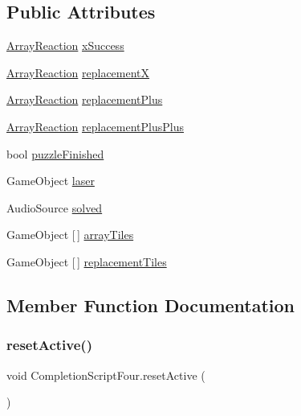 \subsection*{Public Attributes}
\begin{DoxyCompactItemize}
\item 
\hyperlink{class_array_reaction}{Array\+Reaction} \hyperlink{class_completion_script_four_a747aafbf72eb507c388cb72ad6911b13}{x\+Success}
\item 
\hyperlink{class_array_reaction}{Array\+Reaction} \hyperlink{class_completion_script_four_a0ca2da180578a27db3671b64e3c83aa7}{replacementX}
\item 
\hyperlink{class_array_reaction}{Array\+Reaction} \hyperlink{class_completion_script_four_a7e5f7bcf0c065ea353de75d5d1691ec5}{replacement\+Plus}
\item 
\hyperlink{class_array_reaction}{Array\+Reaction} \hyperlink{class_completion_script_four_ad490db1318afdbb5065effc988b97652}{replacement\+Plus\+Plus}
\item 
bool \hyperlink{class_completion_script_four_a68c845d369b9cbc78be0596acf49040a}{puzzle\+Finished}
\item 
Game\+Object \hyperlink{class_completion_script_four_ac3a10e751902cbc84d5ca93bc321509a}{laser}
\item 
Audio\+Source \hyperlink{class_completion_script_four_ac78527b696de4ff5992bec7fef332014}{solved}
\item 
Game\+Object \mbox{[}$\,$\mbox{]} \hyperlink{class_completion_script_four_afb5331e25190b2ccd25dda02ebc6f2fa}{array\+Tiles}
\item 
Game\+Object \mbox{[}$\,$\mbox{]} \hyperlink{class_completion_script_four_a5f540699a916116acc868e46b2445352}{replacement\+Tiles}
\end{DoxyCompactItemize}


\subsection{Member Function Documentation}
\mbox{\label{class_completion_script_four_a49300ed9b78d89b8f68cdf6391925498}} 
\subsubsection{\texorpdfstring{reset\+Active()}{resetActive()}}
{\footnotesize\ttfamily void Completion\+Script\+Four.\+reset\+Active (\begin{DoxyParamCaption}{ }\end{DoxyParamCaption})}

